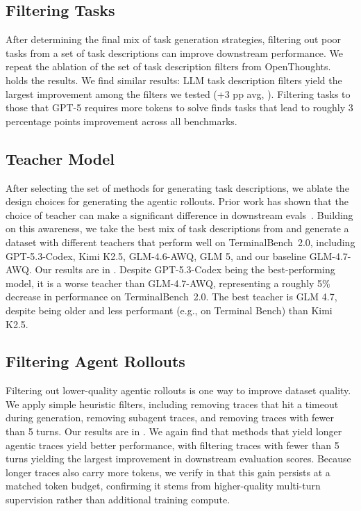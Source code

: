 \documentclass{llmxive}
\begin{document}
\subsection{Filtering Tasks}
\label{sec:task_filtering}

After determining the final mix of task generation strategies, filtering out poor tasks from a set of task descriptions can improve downstream performance. We repeat the ablation of the set of task description filters from OpenThoughts.  holds the results. We find similar results: LLM task description filters yield the largest improvement among the filters we tested (+3 pp avg, ). Filtering tasks to those that GPT-5 requires more tokens to solve finds tasks that lead to roughly 3 percentage points improvement across all benchmarks.

\subsection{Teacher Model}
\label{sec:teacher_ablation}

After selecting the set of methods for generating task descriptions, we ablate the design choices for generating the agentic rollouts. Prior work has shown that the choice of teacher can make a significant difference in downstream evals~\citep{guha2025openthoughtsdatarecipesreasoning}. Building on this awareness, we take the best mix of task descriptions from  and generate a dataset with different teachers that perform well on TerminalBench~2.0, including GPT-5.3-Codex, Kimi K2.5, GLM-4.6-AWQ, GLM 5, and our baseline GLM-4.7-AWQ. Our results are in . Despite GPT-5.3-Codex being the best-performing model, it is a worse teacher than GLM-4.7-AWQ, representing a roughly 5\% decrease in performance on TerminalBench~2.0. The best teacher is GLM 4.7, despite being older and less performant (e.g., on Terminal Bench) than Kimi K2.5.



\subsection{Filtering Agent Rollouts}
\label{sec:trajectory_filtering}

Filtering out lower-quality agentic rollouts is one way to improve dataset quality. We apply simple heuristic filters, including removing traces that hit a timeout during generation, removing subagent traces, and removing traces with fewer than 5 turns. Our results are in . We again find that methods that yield longer agentic traces yield better performance, with filtering traces with fewer than 5 turns yielding the largest improvement in downstream evaluation scores.
Because longer traces also carry more tokens, we verify in  that this gain persists at a matched token budget, confirming it stems from higher-quality multi-turn supervision rather than additional training compute.
\end{document}
